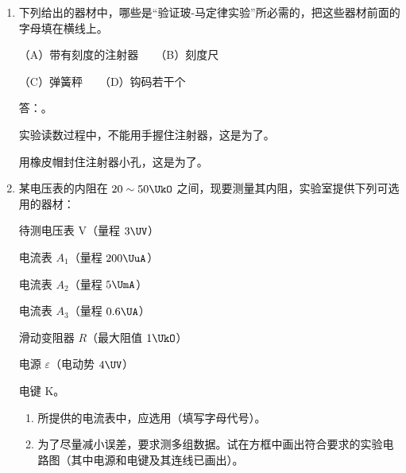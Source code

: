\documentclass[\gkver]{gaokaozhenti}
\begin{document}
\begin{enumerate}
\jdanswer{
$29.80\Umm$
}


\item
下列给出的器材中，哪些是“验证玻-马定律实验”所必需的，把这些器材前面的字母填在横线上。

（A）带有刻度的注射器　　（B）刻度尺

（C）弹簧秤　　（D）钩码若干个

答：。

实验读数过程中，不能用手握住注射器，这是为了。

用橡皮帽封住注射器小孔，这是为了。



\item
某电压表的内阻在 $20\sim50\UkO$ 之间，现要测量其内阻，实验室提供下列可选用的器材：

待测电压表 V（量程 $3\UV$）

电流表 $A_{1}$（量程 $200\UuA$）

电流表 $A_{2}$（量程 $5\UmA$）

电流表 $A_{3}$（量程 $0.6\UA$）

滑动变阻器 $R$（最大阻值 $1\UkO$）

电源 $\varepsilon$（电动势 $4\UV$）

电键 K。
\begin{enumerate}
	\item
	所提供的电流表中，应选用（填写字母代号）。
	\item
	为了尽量减小误差，要求测多组数据。试在方框中画出符合要求的实验电路图（其中电源和电键及其连线已画出）。
\end{enumerate}


\end{enumerate}
\end{document}
